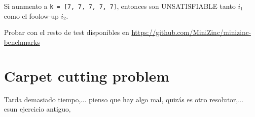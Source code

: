 Si aunmento a \texttt{k = [7, 7, 7, 7, 7]}, entonces son UNSATISFIABLE tanto $i_1$ como el foolow-up $i_2$.

\medskip
\medskip

Probar con el resto de test  disponibles en 
\url{https://github.com/MiniZinc/minizinc-benchmarks}


\section{Carpet cutting problem}

Tarda demasiado tiempo,... pienso que hay algo mal, quizás es otro resolutor,... esun ejercicio antiguo,  